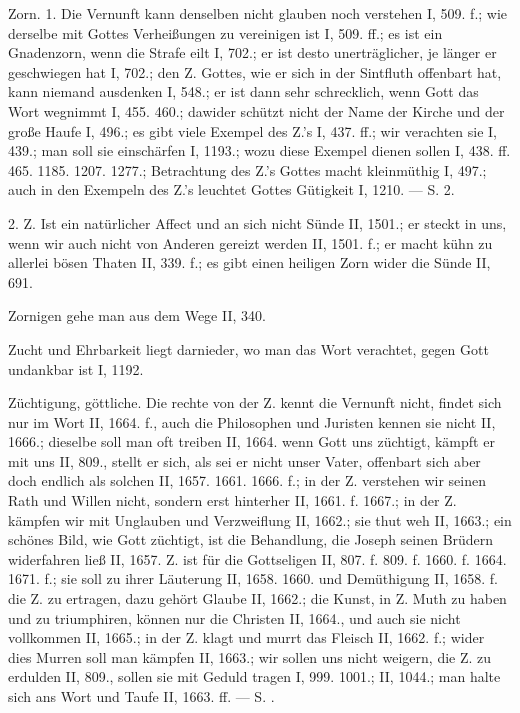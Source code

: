 Zorn. 1.  Die Vernunft kann denselben nicht glauben noch verstehen I, 509. f.; wie derselbe mit Gottes Verheißungen zu vereinigen ist I, 509. ff.; es ist ein Gnadenzorn, wenn die Strafe eilt I, 702.; er ist desto unerträglicher, je länger er geschwiegen hat I, 702.; den Z. Gottes, wie er sich in der Sintfluth offenbart hat, kann niemand ausdenken I, 548.; er ist dann
sehr schrecklich, wenn Gott das Wort wegnimmt I, 455. 460.; dawider schützt nicht der Name der Kirche und der große Haufe I, 496.; es gibt viele Exempel des Z.’s I, 437. ff.; wir verachten sie I, 439.; man soll sie einschärfen I, 1193.; wozu diese Exempel dienen sollen I, 438. ff. 465. 1185. 1207. 1277.; Betrachtung des Z.’s Gottes macht kleinmüthig I, 497.; auch in den Exempeln des Z.’s leuchtet Gottes Gütigkeit I, 1210. — S.  2.

2. Z.  Ist ein natürlicher Affect und an sich nicht Sünde II, 1501.; er steckt in uns, wenn wir auch nicht von Anderen gereizt werden II, 1501. f.; er macht kühn zu allerlei bösen Thaten II, 339. f.; es gibt einen heiligen Zorn wider die Sünde II, 691.

Zornigen gehe man aus dem Wege II, 340.

Zucht und Ehrbarkeit liegt darnieder, wo man das Wort verachtet, gegen Gott undankbar ist I, 1192.

Züchtigung, göttliche. Die rechte  von der Z. kennt die Vernunft nicht, findet sich nur im Wort II, 1664. f., auch die Philosophen und Juristen kennen sie nicht II, 1666.; dieselbe soll man oft treiben II, 1664.  wenn Gott uns züchtigt, kämpft er mit uns II, 809., stellt er sich, als sei er nicht unser Vater, offenbart sich aber doch endlich als solchen II, 1657. 1661. 1666. f.; in der Z. verstehen wir seinen Rath und Willen nicht, sondern erst hinterher II, 1661. f. 1667.; in der Z. kämpfen wir mit Unglauben und Verzweiflung II, 1662.; sie thut weh II, 1663.; ein schönes Bild, wie Gott züchtigt, ist die Behandlung, die Joseph seinen Brüdern widerfahren ließ II, 1657. Z. ist  für die Gottseligen II, 807. f. 809. f. 1660. f. 1664. 1671. f.; sie soll  zu ihrer Läuterung II, 1658. 1660. und Demüthigung II, 1658. f.  die Z. zu ertragen, dazu gehört Glaube II, 1662.; die Kunst, in Z. Muth zu haben und zu triumphiren, können nur die Christen II, 1664., und auch sie nicht vollkommen II, 1665.; in der Z. klagt und murrt das Fleisch II, 1662. f.; wider dies Murren soll man kämpfen II, 1663.; wir sollen uns nicht weigern, die Z. zu erdulden II, 809., sollen sie mit Geduld tragen I, 999. 1001.; II, 1044.; man halte sich ans Wort und Taufe II, 1663. ff. — S. .

